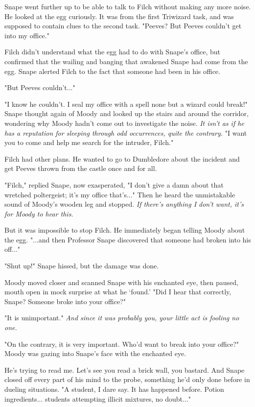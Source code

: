 Snape went further up to be able to talk to Filch without making any more noise. He looked at the egg curiously. It was from the first Triwizard task, and was supposed to contain clues to the second task. "Peeves? But Peeves couldn't get into my office."

Filch didn't understand what the egg had to do with Snape's office, but confirmed that the wailing and banging that awakened Snape had come from the egg. Snape alerted Filch to the fact that someone had been in his office.

"But Peeves couldn't..."

"I know he couldn't. I seal my office with a spell none but a wizard could break!" Snape thought again of Moody and looked up the stairs and around the corridor, wondering why Moody hadn't come out to investigate the noise. \emph{It isn't as if he has a reputation for sleeping through odd occurrences, quite the contrary.} "I want you to come and help me search for the intruder, Filch."

Filch had other plans. He wanted to go to Dumbledore about the incident and get Peeves thrown from the castle once and for all.

"Filch," replied Snape, now exasperated, "I don't give a damn about that wretched poltergeist; it's my office that's..." Then he heard the unmistakable sound of Moody's wooden leg and stopped. \emph{If there's anything I don't want, it's for Moody to hear this.}

But it was impossible to stop Filch. He immediately began telling Moody about the egg. "...and then Professor Snape discovered that someone had broken into his off..."

"Shut up!" Snape hissed, but the damage was done.

Moody moved closer and scanned Snape with his enchanted eye, then paused, mouth open in mock surprise at what he `found.' "Did I hear that correctly, Snape? Someone broke into your office?"

"It is unimportant." \emph{And since it was probably you, your little act is fooling no one.}

"On the contrary, it is very important. Who'd want to break into your office?" Moody was gazing into Snape's face with the enchanted eye.

He's trying to read me. Let's see you read a brick wall, you bastard. And Snape closed off every part of his mind to the probe, something he'd only done before in dueling situations. "A student, I dare say. It has happened before. Potion ingredients... students attempting illicit mixtures, no doubt..."

